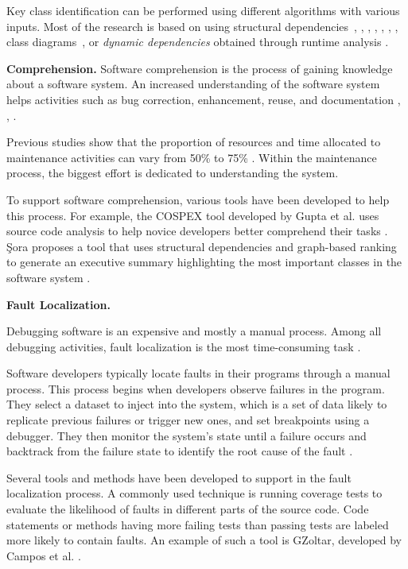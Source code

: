 Key class identification can be performed using different algorithms with various inputs. Most of the research is based on using structural dependencies~\cite{PagerankENASE}, \cite{enase15}, \cite{SoraSpringer}, \cite{PagerankSACI}, \cite{Finding-key-classes}, \cite{ZaidmanJurnal}, \cite{rocclasification}, class diagrams~\cite{6676885}, or \textit{dynamic dependencies} obtained through runtime analysis \cite{ZaidmanJurnal}. 

\textbf{Comprehension.}  
Software comprehension is the process of gaining knowledge about a software system. An increased understanding of the software system helps activities such as bug correction, enhancement, reuse, and documentation \cite{Comprehension}, \cite{1199197}, \cite{2003:XLC:851042.857028}. 

Previous studies show that the proportion of resources and time allocated to maintenance activities can vary from 50\% to 75\% \cite{articleLientz}. Within the maintenance process, the biggest effort is dedicated to understanding the system.

To support software comprehension, various tools have been developed to help this process. For example, the COSPEX tool developed by Gupta et al. uses source code analysis to help novice developers better comprehend their tasks \cite{Comprehension-Gupta}. Şora proposes a tool that uses structural dependencies and graph-based ranking to generate an executive summary highlighting the most important classes in the software system \cite{enase15}.


\textbf{Fault Localization.}

Debugging software is an expensive and mostly a manual process. Among all debugging activities, fault localization is the most time-consuming task \cite{articleDebugging}. 

Software developers typically locate faults in their programs through a manual process. This process begins when developers observe failures in the program. They select a dataset to inject into the system, which is a set of data likely to replicate previous failures or trigger new ones, and set breakpoints using a debugger. They then monitor the system's state until a failure occurs and backtrack from the failure state to identify the root cause of the fault \cite{fault-localization, program-failures}. 

Several tools and methods have been developed to support in the fault localization process. A commonly used technique is running coverage tests to evaluate the likelihood of faults in different parts of the source code. Code statements or methods having more failing tests than passing tests are labeled more likely to contain faults. An example of such a tool is GZoltar, developed by Campos et al. \cite{fault-gz}. 

